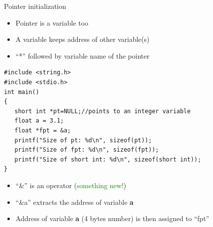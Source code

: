\begin{frame}[fragile]{Pointer initialization}
\begin{itemize}
	\item {Pointer is a variable too}
	\item {A variable keeps address of other variable(s)}
	\item {``*'' followed by variable name of the pointer}
\end{itemize}
\begin{lstlisting}[xleftmargin=0.01\linewidth, linewidth=0.99\linewidth]
#include <string.h>
#include <stdio.h>
int main()
{
   short int *pt=NULL;//points to an integer variable
   float a = 3.1;
   float *fpt = &a;
   printf("Size of pt: %d\n", sizeof(pt));
   printf("Size of fpt: %d\n", sizeof(fpt));
   printf("Size of short int: %d\n", sizeof(short int));
}
\end{lstlisting}
\vspace{-0.15in}
\begin{itemize}
	\item {``\&'' is an operator (\textcolor{green}{something new!})}
	\item {``\&a'' extracts the address of variable \textbf{a}}
	\item {Address of variable \textbf{a} (4 bytes number) is then assigned to ``fpt''}
\end{itemize}
\end{frame}

